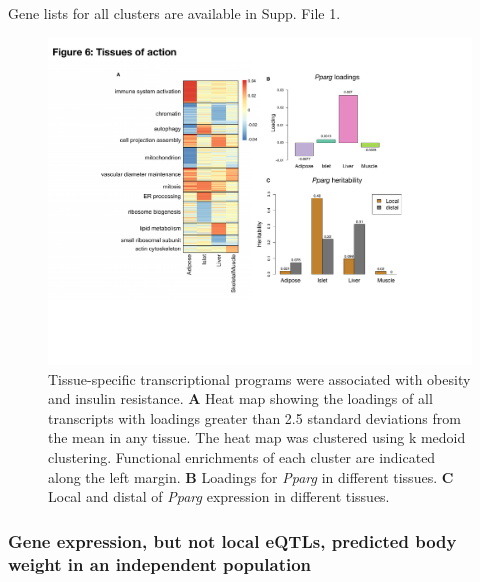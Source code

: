 \documentclass[
]{article}
\providecommand{\DIFdelend}{} %
\DeclareRobustCommand{\DIFdelend}{\DIFOaddend \let\includegraphics\DIFOincludegraphics} %
\begin{document}
\DIFdelend Gene lists for
all clusters are available in Supp. File 1.

\begin{figure}[ht!]
\includegraphics[width=\textwidth]{Figures/Fig6_TOA.pdf} 
\caption{Tissue-specific transcriptional programs were associated 
with obesity and insulin resistance. \textbf{A} Heat map showing 
the loadings of all transcripts with loadings greater than 2.5 
standard deviations from the mean in any tissue. The heat map was 
clustered using k medoid clustering. Functional enrichments of each 
cluster are indicated along the left margin. \textbf{B} Loadings for 
\textit{Pparg} in different tissues. \textbf{C} Local and distal of 
\textit{Pparg} expression in different tissues.
}
\label{fig:toa}
\end{figure}

\subsubsection{Gene expression, but not local eQTLs, predicted body
weight in an independent
population}\label{gene-expression-but-not-local-eqtls-predicted-body-weight-in-an-independent-population}
\end{document}
